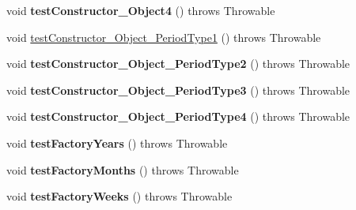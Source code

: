 \begin{DoxyCompactItemize}
\item 
\hypertarget{classorg_1_1joda_1_1time_1_1_test_period___constructors_ad63af754473c85de43640f4c0ad0bd69}{void {\bfseries test\-Constructor\-\_\-\-Object4} ()  throws Throwable }\label{classorg_1_1joda_1_1time_1_1_test_period___constructors_ad63af754473c85de43640f4c0ad0bd69}

\item 
void \hyperlink{classorg_1_1joda_1_1time_1_1_test_period___constructors_a9edb3c63fdbbce25cedf85995a9c367d}{test\-Constructor\-\_\-\-Object\-\_\-\-Period\-Type1} ()  throws Throwable 
\item 
\hypertarget{classorg_1_1joda_1_1time_1_1_test_period___constructors_afe9538ce3baed9859d7aab267d26ee43}{void {\bfseries test\-Constructor\-\_\-\-Object\-\_\-\-Period\-Type2} ()  throws Throwable }\label{classorg_1_1joda_1_1time_1_1_test_period___constructors_afe9538ce3baed9859d7aab267d26ee43}

\item 
\hypertarget{classorg_1_1joda_1_1time_1_1_test_period___constructors_a150d3b4f76af8217652fc51cdd03e399}{void {\bfseries test\-Constructor\-\_\-\-Object\-\_\-\-Period\-Type3} ()  throws Throwable }\label{classorg_1_1joda_1_1time_1_1_test_period___constructors_a150d3b4f76af8217652fc51cdd03e399}

\item 
\hypertarget{classorg_1_1joda_1_1time_1_1_test_period___constructors_a11e97ee103dd6ba567626324fceaa930}{void {\bfseries test\-Constructor\-\_\-\-Object\-\_\-\-Period\-Type4} ()  throws Throwable }\label{classorg_1_1joda_1_1time_1_1_test_period___constructors_a11e97ee103dd6ba567626324fceaa930}

\item 
\hypertarget{classorg_1_1joda_1_1time_1_1_test_period___constructors_a2ef05c3a9d9187cd1a36cbbd4ca280b3}{void {\bfseries test\-Factory\-Years} ()  throws Throwable }\label{classorg_1_1joda_1_1time_1_1_test_period___constructors_a2ef05c3a9d9187cd1a36cbbd4ca280b3}

\item 
\hypertarget{classorg_1_1joda_1_1time_1_1_test_period___constructors_a899c751ad8b68d33a9c2db41b349eb57}{void {\bfseries test\-Factory\-Months} ()  throws Throwable }\label{classorg_1_1joda_1_1time_1_1_test_period___constructors_a899c751ad8b68d33a9c2db41b349eb57}

\item 
\hypertarget{classorg_1_1joda_1_1time_1_1_test_period___constructors_ab9a823449682f74e0d4ef73d24ab7a1d}{void {\bfseries test\-Factory\-Weeks} ()  throws Throwable }\label{classorg_1_1joda_1_1time_1_1_test_period___constructors_ab9a823449682f74e0d4ef73d24ab7a1d}


\end{DoxyCompactItemize}
